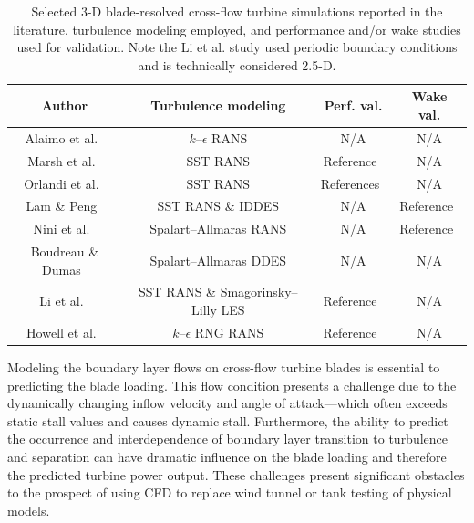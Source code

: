 \documentclass[aip,graphicx]{revtex4-1}
\begin{document}
\begin{table}
    \centering
    \begin{tabular}{c|c|c|c}
        Author & Turbulence modeling & Perf. val. & Wake val. \\
        \hline
        Alaimo et al.~\cite{Alaimo2015} & $k$--$\epsilon$ RANS & N/A & N/A \\
        Marsh et al.~\cite{Marsh2015} & SST RANS & Reference~\cite{Rawlings2008} & N/A \\
        Orlandi et al.~\cite{Orlandi2015} & SST RANS & References~\cite{Akins1989,Mertens2003} & N/A \\
        Lam \& Peng~\cite{Lam2016} & SST RANS \& IDDES & N/A & Reference~\cite{Tescione2014} \\
        Nini et al.~\cite{Nini2014} & Spalart--Allmaras RANS & N/A & Reference~\cite{Battisti2011} \\
        Boudreau \& Dumas~\cite{Boudreau2015} & Spalart--Allmaras DDES & N/A & N/A \\
        Li et al.~\cite{Li2013} & SST RANS \& Smagorinsky--Lilly LES & Reference~\cite{McLaren2011} & N/A \\
        Howell et al.~\cite{Howell2010} & $k$--$\epsilon$ RNG RANS & Reference~\cite{Howell2010} & N/A
    \end{tabular}

    \caption{Selected 3-D blade-resolved cross-flow turbine simulations reported
        in the literature, turbulence modeling employed, and performance and/or wake
        studies used for validation. Note the Li et al. study used periodic boundary
        conditions and is technically considered 2.5-D.}

    \label{tab:cfd-refs}
\end{table}

Modeling the boundary layer flows on cross-flow turbine blades is essential to
predicting the blade loading. This flow condition presents a challenge due to
the dynamically changing inflow velocity and angle of attack---which often
exceeds static stall values and causes dynamic stall. Furthermore, the ability
to predict the occurrence and interdependence of boundary layer transition to
turbulence and separation can have dramatic influence on the blade loading and
therefore the predicted turbine power output. These challenges present
significant obstacles to the prospect of using CFD to replace wind tunnel or
tank testing of physical models.
\end{document}

